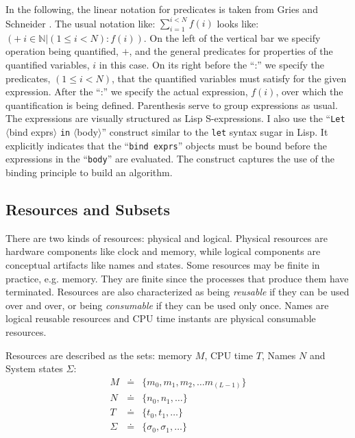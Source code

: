 \documentclass[draft]{article}
\def\names{\doteq}
\begin{document}
In the  following, the  linear notation for  predicates is  taken from
Gries and Schneider  \cite{Gries:1993:LAD:161182}.  The usual notation
like:  $\sum_{i =  1}^{i  < N}  f(i)$  looks like:  $\left  (+\ i  \in
  \mathbb{N} \vert (1  \le i < N) : f(i)\right)$.  On  the left of the
vertical  bar we  specify  operation being  quantified,  $+$, and  the
general predicates for properties  of the quantified variables, $i$ in
this case.  On  its right before the ``:''  we specify the predicates,
$(1 \le  i < N)$, that  the quantified variables must  satisfy for the
given expression.   After the ``:'' we specify  the actual expression,
$f(i)$, over  which the quantification is  being defined.  Parenthesis
serve  to group expressions  as usual.   The expressions  are visually
structured  as  Lisp S-expressions.   I  also  use the  ``\texttt{Let}
$\langle$bind   exprs$\rangle$   \texttt{in}  $\langle$body$\rangle$''
construct  similar  to the  \texttt{let}  syntax  sugar  in Lisp.   It
explicitly indicates that the  ``\texttt{bind exprs}'' objects must be
bound before  the expressions in the  ``\texttt{body}'' are evaluated.
The construct  captures the use of  the binding principle  to build an
algorithm.

\subsection{Resources and Subsets}
\label{sec:resources:subsets}

There  are two  kinds of  resources: physical  and  logical.  Physical
resources are hardware components like clock and memory, while logical
components  are  conceptual artifacts  like  names  and states.   Some
resources may  be finite  in practice, e.g.  memory.  They  are finite
since the processes that  produce them have terminated.  Resources are
also characterized as  being \emph{reusable} if they can  be used over
and over,  or being \emph{consumable} if  they can be  used only once.
Names  are  logical  reusable  resources  and CPU  time  instants  are
physical consumable resources.

Resources are described  as the sets: memory $M$,  CPU time $T$, Names
$N$ and System states $\Sigma$:
\begin{eqnarray}
  \label{eq:the:memory:set}
  M &\names& \{m_0, m_1, m_2, \ldots m_{(L-1)}\} \\
  \label{eq:the:name:set}
  N &\names& \{n_0, n_1, \ldots\} \\
  \label{eq:the:cputime:set}
  T &\names& \{t_0, t_1, \ldots\} \\
  \label{eq:the:state:set}
  \Sigma &\names& \{\sigma_0, \sigma_1, \ldots\}
\end{eqnarray}
\end{document}
